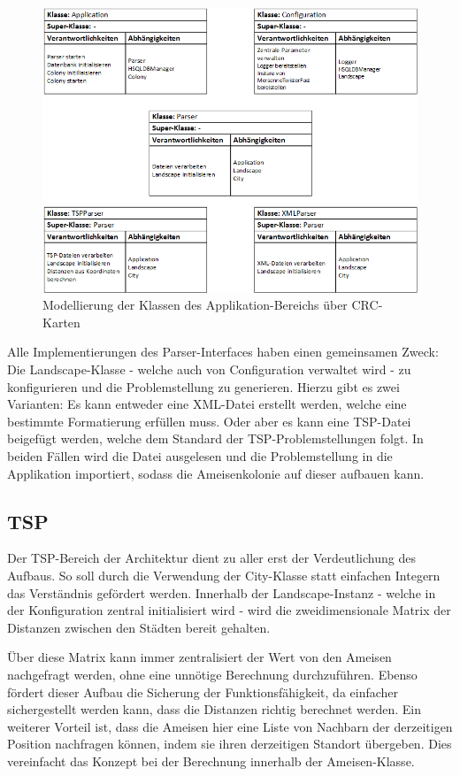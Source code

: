 \begin{figure}[h]
	\centering
	\includegraphics[width=\linewidth]{images/CRC_applikation.png}
	\caption{Modellierung der Klassen des Applikation-Bereichs über CRC-Karten}
	\label{crcApplikation}
\end{figure}

Alle Implementierungen des Parser-Interfaces haben einen gemeinsamen Zweck: Die Landscape-Klasse - welche auch von Configuration verwaltet wird - zu konfigurieren und die Problemstellung zu generieren. Hierzu gibt es zwei Varianten: Es kann entweder eine XML-Datei erstellt werden, welche eine bestimmte Formatierung erfüllen muss. Oder aber es kann eine \ac{TSP}-Datei beigefügt werden, welche dem Standard der \ac{TSP}-Problemstellungen folgt. In beiden Fällen wird die Datei ausgelesen und die Problemstellung in die Applikation importiert, sodass die Ameisenkolonie auf dieser aufbauen kann.

\subsection{TSP}
Der \ac{TSP}-Bereich der Architektur dient zu aller erst der Verdeutlichung des Aufbaus. So soll durch die Verwendung der City-Klasse statt einfachen Integern das Verständnis gefördert werden. Innerhalb der Landscape-Instanz - welche in der Konfiguration zentral initialisiert wird -  wird die zweidimensionale Matrix der Distanzen zwischen den Städten bereit gehalten. 

Über diese Matrix kann immer zentralisiert der Wert von den Ameisen nachgefragt werden, ohne eine unnötige Berechnung durchzuführen. Ebenso fördert dieser Aufbau die Sicherung der Funktionsfähigkeit, da einfacher sichergestellt werden kann, dass die Distanzen richtig berechnet werden. Ein weiterer Vorteil ist, dass die Ameisen hier eine Liste von Nachbarn der derzeitigen Position nachfragen können, indem sie ihren derzeitigen Standort übergeben. Dies vereinfacht das Konzept bei der Berechnung innerhalb der Ameisen-Klasse.

